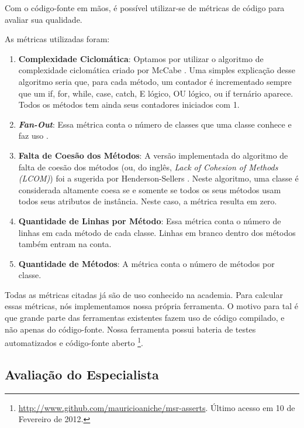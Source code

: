 \documentclass[conference]{IEEEtran}
\begin{document}
Com o código-fonte em mãos, é possível utilizar-se de métricas de código
para avaliar sua qualidade.

As métricas utilizadas foram:

\begin{enumerate}
	\item \textbf{Complexidade Ciclomática}: Optamos por utilizar o algoritmo de complexidade ciclomática criado
	por McCabe \cite{mccabe}. Uma simples explicação desse algoritmo seria que, para cada método, um contador
	é incrementado sempre que um if, for, while, case, catch, E lógico, OU lógico, ou if ternário aparece.
	Todos os métodos tem ainda seus contadores iniciados com 1. 
	
	\item \textbf{\textit{Fan-Out}}: Essa métrica conta o número de classes que uma classe conhece e faz uso \cite{lorenz}.
	
	\item \textbf{Falta de Coesão dos Métodos}: A versão implementada do algoritmo de falta de coesão dos métodos 
	(ou, do inglês, \textit{Lack of Cohesion of Methods (LCOM)}) foi a sugerida por Henderson-Sellers \cite{lcom-hs}.
	Neste algoritmo, uma classe é considerada altamente coesa se e somente se todos os seus métodos usam
	todos seus atributos de instância. Neste caso, a métrica resulta em zero. 
	
	\item \textbf{Quantidade de Linhas por Método}: Essa métrica conta o número de linhas em cada método de
	cada classe. Linhas em branco dentro dos métodos também entram na conta.
	
	\item \textbf{Quantidade de Métodos}: A métrica conta o número de métodos por classe.
	
\end{enumerate}

Todas as métricas citadas já são de uso conhecido na academia. Para calcular essas
métricas, nós implementamos nossa própria ferramenta. O motivo para tal é que
grande parte das ferramentas existentes fazem uso de código compilado, e não
apenas do código-fonte. Nossa ferramenta possui bateria de testes automatizados
e código-fonte aberto \footnote{\url{http://www.github.com/mauricioaniche/msr-asserts}. 
Último acesso em 10 de Fevereiro de 2012.}.

\subsection{Avaliação do Especialista}
\label{sec:planejamento-especialista}
\end{document}
